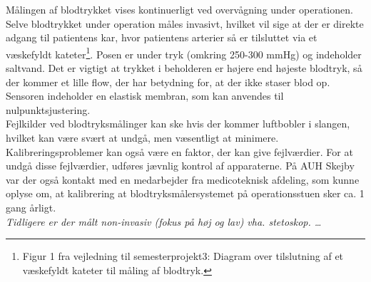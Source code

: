 Målingen af blodtrykket vises kontinuerligt ved overvågning under operationen. Selve blodtrykket under operation måles invasivt, hvilket vil sige at der er direkte adgang til patientens kar, hvor patientens arterier så er tilsluttet via et væskefyldt kateter\footnote{Figur 1 fra vejledning til semesterprojekt3: Diagram over tilslutning af et væskefyldt kateter til måling af blodtryk.}. Posen er under tryk (omkring 250-300 mmHg) og indeholder saltvand. Det er vigtigt at trykket i beholderen er højere end højeste blodtryk, så der kommer et lille flow, der har betydning for, at der ikke staser blod op. Sensoren indeholder en elastisk membran, som kan anvendes til nulpunktsjustering. \\
\newline
Fejlkilder ved blodtryksmålinger kan ske hvis der kommer luftbobler i slangen, hvilket kan være svært at undgå, men væsentligt at minimere. Kalibreringsproblemer kan også være en faktor, der kan give fejlværdier. For at undgå disse fejlværdier, udføres jævnlig kontrol af apparaterne.  
På AUH Skejby var der også kontakt med en medarbejder fra medicoteknisk afdeling, som kunne oplyse om, at kalibrering at blodtryksmålersystemet på operationsstuen sker ca. 1 gang årligt. \\
\newline
\textit{Tidligere er der målt non-invasiv (fokus på høj og lav) vha. stetoskop. …}

